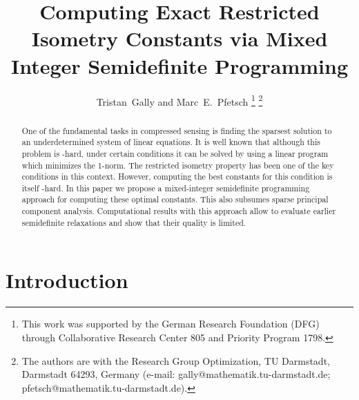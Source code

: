 \documentclass[journal]{IEEEtran}
\newcommand{\NP}{\text{NP}}
\begin{document}
\title{Computing Exact Restricted Isometry Constants via Mixed Integer Semidefinite Programming}
\author{Tristan~Gally and Marc~E.~Pfetsch
  \thanks{This work was supported by the German Research Foundation (DFG) through Collaborative Research Center 805 and Priority Program 1798.}
  \thanks{The  authors  are  with  the  Research  Group  Optimization,  TU  Darmstadt,
  Darmstadt  64293,  Germany  (e-mail:  gally@mathematik.tu-darmstadt.de;
  pfetsch@mathematik.tu-darmstadt.de).}}


\maketitle

\noindent
\begin{abstract}
  One of the fundamental tasks in compressed sensing is finding the
  sparsest solution to an underdetermined system of linear equations. It is
  well known that although this problem is \NP-hard, under certain
  conditions it can be solved by using a linear program which minimizes the
  1-norm. The restricted isometry property has been one of the key
  conditions in this context. However, computing the best constants for
  this condition is itself \NP-hard. In this paper we propose a
  mixed-integer semidefinite programming approach for computing these
  optimal constants. This also subsumes sparse principal component
  analysis. Computational results with this approach allow to evaluate
  earlier semidefinite relaxations and show that their quality is limited.
\end{abstract}

\section{Introduction}
\end{document}
